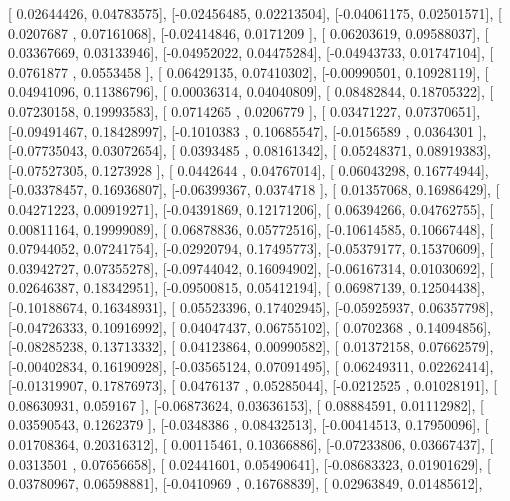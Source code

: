 \documentclass{article}
\begin{document}
       [ 0.02644426,  0.04783575],
       [-0.02456485,  0.02213504],
       [-0.04061175,  0.02501571],
       [ 0.0207687 ,  0.07161068],
       [-0.02414846,  0.0171209 ],
       [ 0.06203619,  0.09588037],
       [ 0.03367669,  0.03133946],
       [-0.04952022,  0.04475284],
       [-0.04943733,  0.01747104],
       [ 0.0761877 ,  0.0553458 ],
       [ 0.06429135,  0.07410302],
       [-0.00990501,  0.10928119],
       [ 0.04941096,  0.11386796],
       [ 0.00036314,  0.04040809],
       [ 0.08482844,  0.18705322],
       [ 0.07230158,  0.19993583],
       [ 0.0714265 ,  0.0206779 ],
       [ 0.03471227,  0.07370651],
       [-0.09491467,  0.18428997],
       [-0.1010383 ,  0.10685547],
       [-0.0156589 ,  0.0364301 ],
       [-0.07735043,  0.03072654],
       [ 0.0393485 ,  0.08161342],
       [ 0.05248371,  0.08919383],
       [-0.07527305,  0.1273928 ],
       [ 0.0442644 ,  0.04767014],
       [ 0.06043298,  0.16774944],
       [-0.03378457,  0.16936807],
       [-0.06399367,  0.0374718 ],
       [ 0.01357068,  0.16986429],
       [ 0.04271223,  0.00919271],
       [-0.04391869,  0.12171206],
       [ 0.06394266,  0.04762755],
       [ 0.00811164,  0.19999089],
       [ 0.06878836,  0.05772516],
       [-0.10614585,  0.10667448],
       [ 0.07944052,  0.07241754],
       [-0.02920794,  0.17495773],
       [-0.05379177,  0.15370609],
       [ 0.03942727,  0.07355278],
       [-0.09744042,  0.16094902],
       [-0.06167314,  0.01030692],
       [ 0.02646387,  0.18342951],
       [-0.09500815,  0.05412194],
       [ 0.06987139,  0.12504438],
       [-0.10188674,  0.16348931],
       [ 0.05523396,  0.17402945],
       [-0.05925937,  0.06357798],
       [-0.04726333,  0.10916992],
       [ 0.04047437,  0.06755102],
       [ 0.0702368 ,  0.14094856],
       [-0.08285238,  0.13713332],
       [ 0.04123864,  0.00990582],
       [ 0.01372158,  0.07662579],
       [-0.00402834,  0.16190928],
       [-0.03565124,  0.07091495],
       [ 0.06249311,  0.02262414],
       [-0.01319907,  0.17876973],
       [ 0.0476137 ,  0.05285044],
       [-0.0212525 ,  0.01028191],
       [ 0.08630931,  0.059167  ],
       [-0.06873624,  0.03636153],
       [ 0.08884591,  0.01112982],
       [ 0.03590543,  0.1262379 ],
       [-0.0348386 ,  0.08432513],
       [-0.00414513,  0.17950096],
       [ 0.01708364,  0.20316312],
       [ 0.00115461,  0.10366886],
       [-0.07233806,  0.03667437],
       [ 0.0313501 ,  0.07656658],
       [ 0.02441601,  0.05490641],
       [-0.08683323,  0.01901629],
       [ 0.03780967,  0.06598881],
       [-0.0410969 ,  0.16768839],
       [ 0.02963849,  0.01485612],
\end{document}
